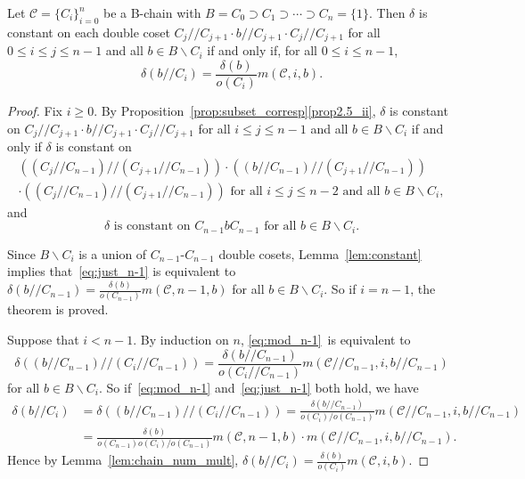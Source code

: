\begin{thm}
\label{thm:constant_2coset}
Let $\mathcal{C} = \{C_i\}_{i=0}^n$ be a B-chain with $B = C_0 \supset
C_1 \supset \cdots \supset C_n = \{1\}$. Then $\delta$ is constant on
each double coset $C_j//C_{j+1}\cdot b//C_{j+1}\cdot C_j//C_{j+1}$ for
all $0 \leq i \leq j \leq n-1$ and all $b \in B\backslash C_i$ if and only if,
for all $0 \leq i \leq n-1$,
\[
\delta(b//C_i) = \frac{\delta(b)}{o(C_i)}m(\mathcal{C}, i, b).
\]
\end{thm}
 
\begin{proof}
Fix $i \geq 0$. By Proposition~\ref{prop:subset_corresp}\ref{prop2.5_ii}, $\delta$ is constant on
$C_j//C_{j+1}\cdot b//C_{j+1}\cdot C_j//C_{j+1}$ for all $i \leq j
\leq n-1$ and all $b \in B\backslash C_i$ if and only if $\delta$ is
constant on 
\begin{multline}\label{eq:mod_n-1} 
\left((C_j//C_{n-1})//(C_{j+1}//C_{n-1})\right)\cdot
\left((b//C_{n-1})//(C_{j+1}//C_{n-1})\right)
\\
\cdot
\left((C_j//C_{n-1})//(C_{j+1}//C_{n-1})\right)
\mbox{ for all }i \leq j \leq n-2 \mbox{ and all }b \in
B\backslash C_i, 
\end{multline}
and
\begin{equation}
\label{eq:just_n-1}
\delta \mbox{ is constant on } C_{n-1}bC_{n-1} \mbox{ for all }b \in
B\backslash C_i.
\end{equation} 
 
Since $B\backslash C_i$ is a union of $C_{n-1}$-$C_{n-1}$ double cosets,
Lemma~\ref{lem:constant} implies that~\eqref{eq:just_n-1} is equivalent
to $\delta(b//C_{n-1}) = \frac{\delta(b)}{o(C_{n-1})}m(\mathcal{C}, n-1,
b)$ for all $b \in B\backslash C_i$. So if $i = n-1$, the theorem is
proved. 

Suppose that $i < n-1$. By induction on $n$, \eqref{eq:mod_n-1}~is
equivalent to 
\[
\delta\left((b//C_{n-1})//(C_i//C_{n-1})\right) = 
\frac{\delta(b//C_{n-1})}{o(C_i//C_{n-1})}m(\mathcal{C}//C_{n-1}, i,
b//C_{n-1})
\]
for all $b \in B\backslash C_i$. So if~\eqref{eq:mod_n-1} and~\eqref{eq:just_n-1} both hold, we have
\[
\begin{aligned}
\delta(b//C_i) &= \delta \left((b//C_{n-1})//(C_i//C_{n-1})\right) =
\frac{\delta(b//C_{n-1})}{o(C_i)/o(C_{n-1})}m(\mathcal{C}//C_{n-1}, i,
b//C_{n-1})
\\
&= \frac{\delta(b)}{o(C_{n-1})o(C_i)/o(C_{n-1})}m(\mathcal{C}, n-1,
b)\cdot m(\mathcal{C}//C_{n-1}, i, b//C_{n-1}).
\end{aligned}
\]
Hence by Lemma~\ref{lem:chain_num_mult}, $\delta(b//C_i) =
\frac{\delta(b)}{o(C_i)}m(\mathcal{C}, i, b)$.


\end{proof}
